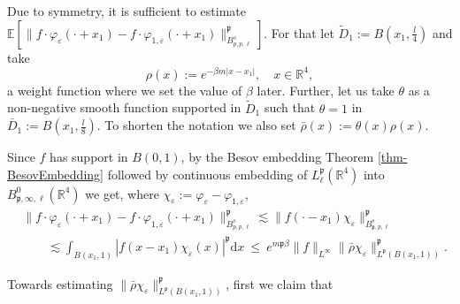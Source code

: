 \documentclass{article}
\newcommand\dela[1]{}
\newcommand{\assign}{:=}
\newcommand{\mathd}{\mathrm{d}}
\begin{document}
Due to symmetry, it is sufficient to estimate $\mathbb{E} [\| f \cdot
\varphi_{\varepsilon} (\cdot + x_1) - f \cdot \varphi_{1, \varepsilon} (\cdot
+ x_1) \|_{B_{p, p, \ell}^s}^{\mathfrak{p}}]$. For that let $\tilde{D}_1
\assign B \left( x_1, \frac{l}{4} \right)$ and take 
%
\[\rho (x) \assign e^{- \beta m | x - x_1 |}, \quad x
\in \mathbb{R}^4, \]  
%
a weight function where we set the value of $\beta$ later.
Further, let us take $\theta$ as a non-negative smooth function supported in
$\tilde{D}_1$ such that $\theta = 1$ in $\bar{D}_1 \assign B \left( x_1,
\frac{l}{8} \right)$. To shorten the notation we also set $\bar{\rho} (x) :=
\theta (x) \rho (x)$.


Since $f$ has support in $B (0, 1)$, by the Besov
embedding Theorem \ref{thm-BesovEmbedding} followed by continuous embedding of
$L_{\ell}^{\mathfrak{p}}(\mathbb{R}^4)$ into $B^0_{\mathfrak{p}, \infty, \ell}(\mathbb{R}^4)$ we get,
where $\chi_{\varepsilon} \assign \varphi_{\varepsilon} - \varphi_{1,
\varepsilon}$,
%
\begin{align}\label{eqn0}
    & \| f \cdot \varphi_{\varepsilon} (\cdot + x_1) - f \cdot \varphi_{1,
    \varepsilon} (\cdot + x_1) \|_{B_{p, p, \ell}^s}^{\mathfrak{p}} \lesssim
     \| f (\cdot - x_1) \chi_{\varepsilon} \|_{B_{\mathfrak{p}, p,
    \ell}^s}^{\mathfrak{p}} \nonumber \\
    & \qquad \lesssim \int_{B (x_1, 1)} | f (x - x_1) \chi_{\varepsilon} (x)
    |^{\mathfrak{p}} \mathd x ~\leq~ e^{m\mathfrak{p} \beta} \| f \|_{L^{\infty}} \|  \bar{\rho}
    \chi_{\varepsilon} \|^{\mathfrak{p}}_{L^{\mathfrak{p}} (B (x_1, 1))}. 
\end{align}
%
\dela{
\begin{equation}
  \begin{array}{lll}
    \| f \cdot \varphi_{\varepsilon} (\cdot + x_1) - f \cdot \varphi_{1,
    \varepsilon} (\cdot + x_1) \|_{B_{p, p, \ell}^s}^{\mathfrak{p}} & \lesssim
    & \| f (\cdot - x_1) \chi_{\varepsilon} \|_{B_{\mathfrak{p}, p,
    \ell}^s}^{\mathfrak{p}}\\
    & \lesssim & \int_{B (x_1, 1)} | f (x - x_1) \chi_{\varepsilon} (x)
    |^{\mathfrak{p}} \mathd x\\
    & \leqslant & e^{m\mathfrak{p} \beta} \| f \|_{L^{\infty}} \|  \bar{\rho}
    \chi_{\varepsilon} \|^{\mathfrak{p}}_{L^{\mathfrak{p}} (B (x_1, 1))} .
  \end{array} %
\end{equation}}
%
Towards estimating $\| \bar{\rho} \chi_{\varepsilon}
\|^{\mathfrak{p}}_{L^{\mathfrak{p}} (B (x_1, 1))} $, first we claim that
\end{document}
